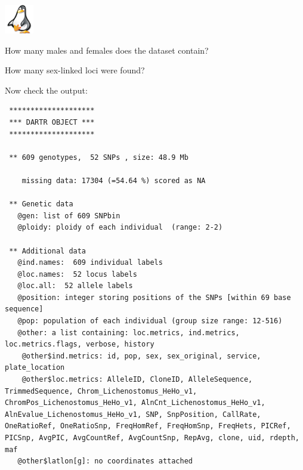 \documentclass[
  letterpaper,
  DIV=11,
  numbers=noendperiod]{scrreprt}
\newenvironment{Shaded}{\begin{snugshade}}{\end{snugshade}}
\newcommand{\CommentTok}[1]{\textcolor[rgb]{0.38,0.63,0.69}{\textit{#1}}}
\newcommand{\NormalTok}[1]{\textcolor[rgb]{0.00,0.44,0.13}{#1}}
\newcommand{\SpecialCharTok}[1]{\textcolor[rgb]{0.25,0.44,0.63}{#1}}
\begin{document}
\begin{tcolorbox}[enhanced jigsaw, coltitle=black, colframe=quarto-callout-note-color-frame, colbacktitle=quarto-callout-note-color!10!white, breakable, bottomtitle=1mm, rightrule=.15mm, opacitybacktitle=0.6, left=2mm, arc=.35mm, opacityback=0, leftrule=.75mm, toptitle=1mm, titlerule=0mm, title=\textcolor{quarto-callout-note-color}{\faInfo}\hspace{0.5em}{Exercise}, bottomrule=.15mm, toprule=.15mm, colback=white]

\includegraphics[width=0.5in,height=0.5in]{images/task.png}

How many males and females does the dataset contain?

How many sex-linked loci were found?

\end{tcolorbox}

Now check the output:

\begin{Shaded}
\end{Shaded}

\begin{verbatim}
 ********************
 *** DARTR OBJECT ***
 ********************

 ** 609 genotypes,  52 SNPs , size: 48.9 Mb

    missing data: 17304 (=54.64 %) scored as NA

 ** Genetic data
   @gen: list of 609 SNPbin
   @ploidy: ploidy of each individual  (range: 2-2)

 ** Additional data
   @ind.names:  609 individual labels
   @loc.names:  52 locus labels
   @loc.all:  52 allele labels
   @position: integer storing positions of the SNPs [within 69 base sequence]
   @pop: population of each individual (group size range: 12-516)
   @other: a list containing: loc.metrics, ind.metrics, loc.metrics.flags, verbose, history 
    @other$ind.metrics: id, pop, sex, sex_original, service, plate_location 
    @other$loc.metrics: AlleleID, CloneID, AlleleSequence, TrimmedSequence, Chrom_Lichenostomus_HeHo_v1, ChromPos_Lichenostomus_HeHo_v1, AlnCnt_Lichenostomus_HeHo_v1, AlnEvalue_Lichenostomus_HeHo_v1, SNP, SnpPosition, CallRate, OneRatioRef, OneRatioSnp, FreqHomRef, FreqHomSnp, FreqHets, PICRef, PICSnp, AvgPIC, AvgCountRef, AvgCountSnp, RepAvg, clone, uid, rdepth, maf 
   @other$latlon[g]: no coordinates attached
\end{verbatim}
\end{document}
